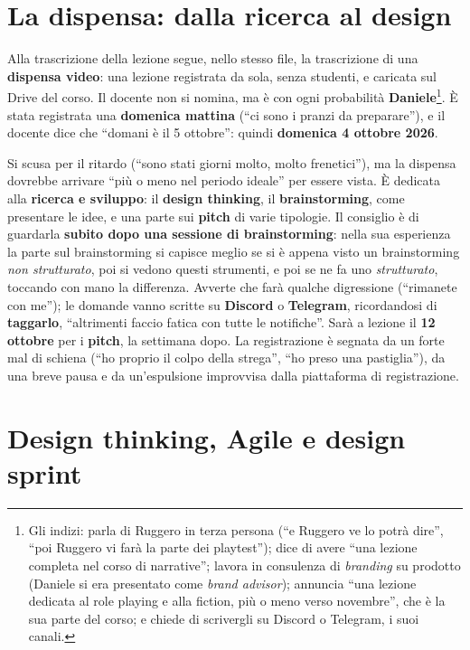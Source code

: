 \section{La dispensa: dalla ricerca al design}
\label{a5:sec:dispensa}

Alla trascrizione della lezione segue, nello stesso file, la trascrizione di una
\textbf{dispensa video}: una lezione registrata da sola, senza studenti, e caricata sul
Drive del corso. Il docente non si nomina, ma è con ogni probabilità
\textbf{Daniele}\footnote{Gli indizi: parla di Ruggero in terza persona (``e Ruggero ve
lo potrà dire'', ``poi Ruggero vi farà la parte dei playtest''); dice di avere ``una
lezione completa nel corso di narrative''; lavora in consulenza di \emph{branding} su
prodotto (Daniele si era presentato come \emph{brand advisor}); annuncia ``una lezione
dedicata al role playing e alla fiction, più o meno verso novembre'', che è la sua parte
del corso; e chiede di scrivergli su Discord o Telegram, i suoi canali.}. È stata
registrata una \textbf{domenica mattina} (``ci sono i pranzi da preparare''), e il
docente dice che ``domani è il 5 ottobre'': quindi \textbf{domenica 4 ottobre 2026}.

Si scusa per il ritardo (``sono stati giorni molto, molto frenetici''), ma la dispensa
dovrebbe arrivare ``più o meno nel periodo ideale'' per essere vista. È dedicata alla
\textbf{ricerca e sviluppo}: il \textbf{design thinking}, il \textbf{brainstorming},
come presentare le idee, e una parte sui \textbf{pitch} di varie tipologie. Il
consiglio è di guardarla \textbf{subito dopo una sessione di brainstorming}: nella sua
esperienza la parte sul brainstorming si capisce meglio se si è appena visto un
brainstorming \emph{non strutturato}, poi si vedono questi strumenti, e poi se ne fa
uno \emph{strutturato}, toccando con mano la differenza. Avverte che farà qualche
digressione (``rimanete con me''); le domande vanno scritte su \textbf{Discord} o
\textbf{Telegram}, ricordandosi di \textbf{taggarlo}, ``altrimenti faccio fatica con
tutte le notifiche''. Sarà a lezione il \textbf{12 ottobre} per i \textbf{pitch}, la
settimana dopo. La registrazione è segnata da un forte mal di schiena (``ho proprio il
colpo della strega'', ``ho preso una pastiglia''), da una breve pausa e da
un'espulsione improvvisa dalla piattaforma di registrazione.

\section{Design thinking, Agile e design sprint}
\label{a5:sec:designthinking}

